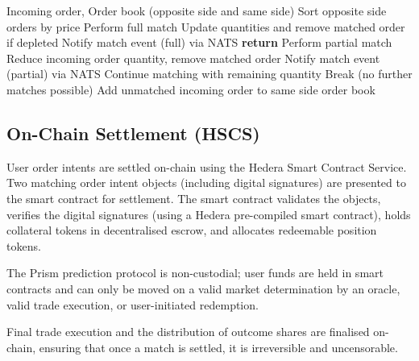 \documentclass[11pt,a4paper]{article}
\begin{document}
\begin{algorithm}[H]
\caption{Order Matching Engine (High-Level Pseudocode)}
\label{alg:order-matching}
\begin{algorithmic}[1]
\Require Incoming order, Order book (opposite side and same side)
\State Sort opposite side orders by price
            \State Perform full match
            \State Update quantities and remove matched order if depleted
            \State Notify match event (full) via NATS
            \State \textbf{return}
        \Else
            \State Perform partial match
            \State Reduce incoming order quantity, remove matched order
            \State Notify match event (partial) via NATS
            \State Continue matching with remaining quantity
        \EndIf
    \Else
        \State Break (no further matches possible)
    \EndIf
\EndFor
\State Add unmatched incoming order to same side order book
\end{algorithmic}
\end{algorithm}




\subsection{On-Chain Settlement (HSCS)}

User order intents are settled on-chain using the Hedera Smart Contract Service. Two matching order intent objects (including digital signatures) are presented to the smart contract for settlement. The smart contract validates the objects, verifies the digital signatures (using a Hedera pre-compiled smart contract), holds collateral tokens in decentralised escrow, and allocates redeemable position tokens.

\begin{description}[leftmargin=0em, style=nextline]
    \item[Non-Custodial] The Prism prediction protocol is non-custodial; user funds are held in smart contracts and can only be moved on a valid market determination by an oracle, valid trade execution, or user-initiated redemption.
    \item[Immutable Settlement] Final trade execution and the distribution of outcome shares are finalised on-chain, ensuring that once a match is settled, it is irreversible and uncensorable.
\end{description}
\end{document}
